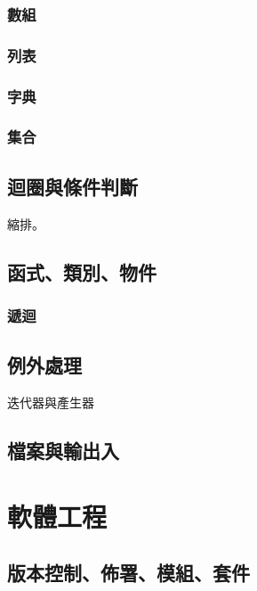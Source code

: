 \documentclass[a4paper,12pt]{book}
\theoremstyle{definition}
\begin{document}
\section{數組}

\section{列表}

\section{字典}

\section{集合}

\chapter{迴圈與條件判斷}
%
\label{c:control}

縮排。

\chapter{函式、類別、物件}
%
\label{c:structure}

\section{遞迴}

\chapter{例外處理}
%
\label{c:exception}

迭代器與產生器

\chapter{檔案與輸出入}
%
\label{c:inout}

\part{軟體工程}
%
\label{p:software}

\chapter{版本控制、佈署、模組、套件}
%
\label{c:deployment}
\end{document}
